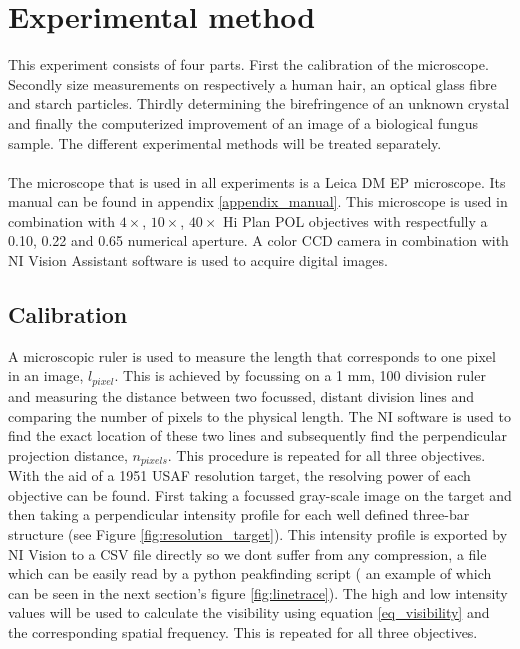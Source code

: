 \section{Experimental method}

This experiment consists of four parts. First the calibration of the microscope. Secondly size measurements on respectively a human hair, an optical glass fibre and starch particles. Thirdly determining the birefringence of an unknown crystal and finally the computerized improvement of an image of a biological fungus sample. The different experimental methods will be treated separately.\\
\\
The microscope that is used in all experiments is a Leica DM EP microscope. Its manual can be found in appendix \ref{appendix_manual}. This microscope is used in combination with $4\times$, $10\times$, $40\times$ Hi Plan POL objectives with respectfully a 0.10, 0.22 and 0.65 numerical aperture. A color CCD camera in combination with NI Vision Assistant software is used to acquire digital images.

\subsection{Calibration}
\label{expmeth_calibration}
A microscopic ruler is used to measure the length that corresponds to one pixel in an image, $l_{pixel}$. This is achieved by focussing on a 1 mm, 100 division ruler and measuring the distance between two focussed, distant division lines and comparing the number of pixels to the physical length. The NI software is used to find the exact location of these two lines and subsequently find the perpendicular projection distance, $n_{pixels}$. This procedure is repeated for all three objectives. \\
\bigskip
With the aid of a 1951 USAF resolution target, the resolving power of each objective can be found. First taking a focussed gray-scale image  on the target and then taking a perpendicular intensity profile for each well defined three-bar structure (see Figure \ref{fig:resolution_target}). This intensity profile is exported by NI Vision to a CSV file directly so we dont suffer from any compression, a file which can be easily read by a python peakfinding script ( an example of which can be seen in the next section's figure \ref{fig:linetrace}). The high and low intensity values will be used to calculate the visibility using equation \ref{eq_visibility} and the corresponding spatial frequency. This is repeated for all three objectives.\\

